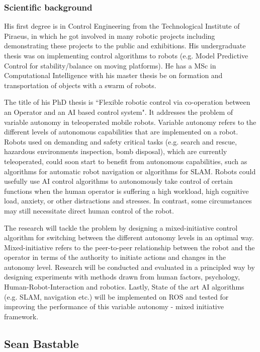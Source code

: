 \documentclass[conference]{IEEEtran}
\begin{document}
\subsubsection*{Scientific background}

His first degree is in Control Engineering from the Technological Institute of Piraeus, in which he got involved in many robotic projects including demonstrating these projects to the public and exhibitions. His undergraduate thesis was on implementing control algorithms to robots (e.g. Model Predictive Control for stability/balance on moving platforms). He has a MSc in Computational Intelligence with his master thesis be on formation and transportation of objects with a swarm of robots.  

The title of his PhD thesis is ``Flexible robotic control via co-operation between an Operator and an AI based control system". It addresses the problem of variable autonomy in teleoperated mobile robots. Variable autonomy refers to the different levels of autonomous capabilities that are implemented on a robot. Robots used on demanding and safety critical tasks (e.g. search and rescue, hazardous environments inspection, bomb disposal), which are currently teleoperated, could soon start to benefit from autonomous capabilities, such as algorithms for automatic robot navigation or algorithms for SLAM. Robots could usefully use AI control algorithms to autonomously take control of certain functions when the human operator is suffering a high workload, high cognitive load, anxiety, or other distractions and stresses. In contrast, some circumstances may still necessitate direct human control of the robot.

The research will tackle the problem by designing a mixed-initiative control algorithm for switching between the different autonomy levels in an optimal way. Mixed-initiative refers to the peer-to-peer relationship between the robot and the operator in terms of the authority to initiate actions and changes in the autonomy level. Research will be conducted and evaluated in a principled way by designing experiments with methods drawn from human factors, psychology, Human-Robot-Interaction and robotics. Lastly, State of the art AI algorithms (e.g. SLAM, navigation etc.) will be implemented on ROS and tested for improving the performance of this variable autonomy - mixed initiative framework.

\subsection{Sean Bastable}
\end{document}

